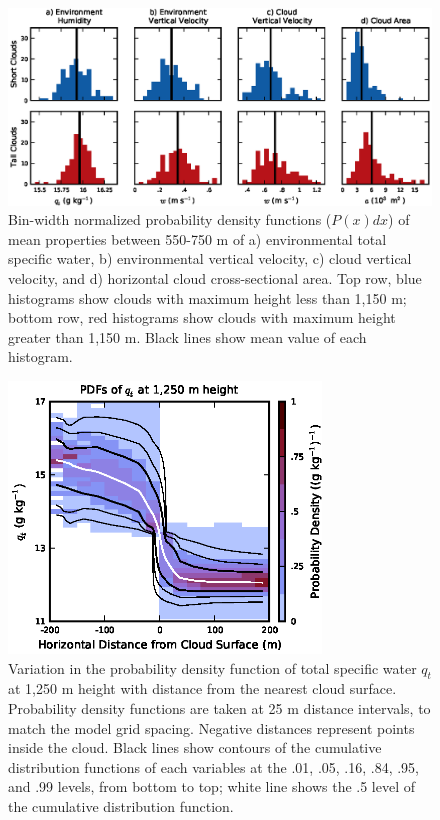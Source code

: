 \documentclass[acp]{copernicus}
\begin{document}
\begin{figure}[t]
\vspace*{2mm}
\begin{center}
\includegraphics[width=\textwidth]{./figures/cloud_environment_histograms}
\end{center}
\caption{Bin-width normalized probability density functions ($P(x)dx$) of 
mean properties between 550-750 m of a) environmental total specific water, 
b) environmental vertical velocity, c) cloud vertical velocity, and 
d) horizontal cloud cross-sectional area.  Top row, blue histograms show clouds 
with maximum height less than 1,150 m; bottom row, red histograms show clouds 
with maximum height greater than 1,150 m.  Black lines show mean value of each 
histogram.}
\label{fig:cloud_environment_histograms}
\end{figure}

\begin{figure}[t]
\vspace*{2mm}
\begin{center}
\includegraphics[width=8.3cm]{./figures/qt_vs_dist}
\end{center}
\caption{Variation in the probability density function of total specific 
water $q_t$ at 1,250 m height with distance from the nearest cloud surface.  
Probability density functions are taken at 25 m distance intervals, to match 
the model grid spacing.  Negative distances represent points inside the cloud.  
Black lines show contours of the cumulative distribution functions of each 
variables at the .01, .05, .16, .84, .95, and .99 levels, from bottom to top; 
white line shows the .5 level of the cumulative distribution function.}
\label{fig:qt_vs_dist}
\end{figure}
\end{document}
